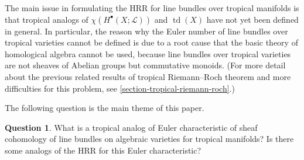 \documentclass[a4paper,dvipdfmx,reqno,12pt]{amsart}
\theoremstyle{definition}
\newtheorem{question}[theorem]{Question}
\newcommand{\opn}[1]{\operatorname{#1}}
\numberwithin{equation}{section}
\begin{document}
The main issue in formulating the HRR 
for line bundles over 
tropical manifolds is that 
tropical analogs of 
$\chi(H^{\bullet}(X;\mathcal{L}))$ and 
$\opn{td}(X)$ have not yet been defined in general.
In particular, the reason why the Euler number 
of line bundles over tropical varieties cannot 
be defined is due to a root cause 
that the basic theory of homological 
algebra cannot be used, 
because line bundles over tropical 
varieties are not sheaves of Abelian groups
but commutative monoids.
(For more detail about the previous related results of 
tropical Riemann--Roch theorem
and more difficulties for 
this problem, see 
\cref{section-tropical-riemann-roch}.)

The following question is the main theme of this 
paper.
\begin{question} \label{question-tropical-euler}
What is a tropical analog of Euler 
characteristic of sheaf 
cohomology of line bundles on algebraic varieties for 
tropical manifolds? Is there some analogs of the HRR 
for this Euler characteristic?
\end{question}
\end{document}
